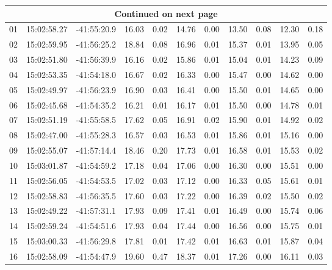 \begin{longtable}{ccccccccccc}
\hline \multicolumn{11}{c}{{Continued on next page}} \\ \hline
\endfoot
\hline \hline
\endfoot
\rowcolor[gray]{0.9}  01 & 15:02:58.27 & -41:55:20.9 & 16.03 & 0.02 & 14.76 & 0.00 & 13.50 & 0.08 & 12.30 & 0.18\\
\rowcolor[gray]{0.9}  02 & 15:02:59.95 & -41:56:25.2 & 18.84 & 0.08 & 16.96 & 0.01 & 15.37 & 0.01 & 13.95 & 0.05\\
\rowcolor[gray]{0.9}  03 & 15:02:51.80 & -41:56:39.9 & 16.16 & 0.02 & 15.86 & 0.01 & 15.04 & 0.01 & 14.23 & 0.09\\
\rowcolor[gray]{0.9}  04 & 15:02:53.35 & -41:54:18.0 & 16.67 & 0.02 & 16.33 & 0.00 & 15.47 & 0.00 & 14.62 & 0.00\\
\rowcolor[gray]{0.9}  05 & 15:02:49.97 & -41:56:23.9 & 16.90 & 0.03 & 16.41 & 0.00 & 15.50 & 0.01 & 14.65 & 0.00\\
\rowcolor[gray]{0.9}  06 & 15:02:45.68 & -41:54:35.2 & 16.21 & 0.01 & 16.17 & 0.01 & 15.50 & 0.00 & 14.78 & 0.01\\
\rowcolor[gray]{0.9}  07 & 15:02:51.19 & -41:55:58.5 & 17.62 & 0.05 & 16.91 & 0.02 & 15.90 & 0.01 & 14.92 & 0.02\\
\rowcolor[gray]{0.9}  08 & 15:02:47.00 & -41:55:28.3 & 16.57 & 0.03 & 16.53 & 0.01 & 15.86 & 0.01 & 15.16 & 0.00\\
\rowcolor[gray]{0.9}  09 & 15:02:55.07 & -41:57:14.4 & 18.46 & 0.20 & 17.73 & 0.01 & 16.58 & 0.01 & 15.53 & 0.02\\
\rowcolor[gray]{0.9}  10 & 15:03:01.87 & -41:54:59.2 & 17.18 & 0.04 & 17.06 & 0.00 & 16.30 & 0.00 & 15.51 & 0.00\\
\rowcolor[gray]{0.9}  11 & 15:02:56.05 & -41:54:53.5 & 17.02 & 0.03 & 17.12 & 0.00 & 16.33 & 0.05 & 15.61 & 0.01\\
\rowcolor[gray]{0.9}  12 & 15:02:58.83 & -41:56:35.5 & 17.60 & 0.03 & 17.22 & 0.00 & 16.39 & 0.02 & 15.50 & 0.02\\
\rowcolor[gray]{0.9}  13 & 15:02:49.22 & -41:57:31.1 & 17.93 & 0.09 & 17.41 & 0.01 & 16.49 & 0.00 & 15.74 & 0.06\\
\rowcolor[gray]{0.9}  14 & 15:02:59.24 & -41:54:51.6 & 17.93 & 0.04 & 17.44 & 0.00 & 16.56 & 0.00 & 15.75 & 0.01\\
\rowcolor[gray]{0.9}  15 & 15:03:00.33 & -41:56:29.8 & 17.81 & 0.01 & 17.42 & 0.01 & 16.63 & 0.01 & 15.87 & 0.04\\
\rowcolor[gray]{0.9}  16 & 15:02:58.09 & -41:54:47.9 & 19.60 & 0.47 & 18.37 & 0.01 & 17.26 & 0.00 & 16.11 & 0.03\\

\end{longtable}
